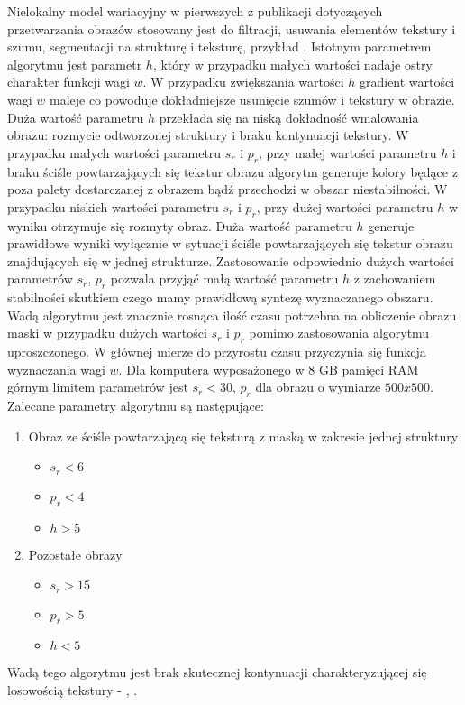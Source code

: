 \documentclass[12pt, twoside, openany]{report}
\theoremstyle{definition}
\begin{document}
Nielokalny model wariacyjny w pierwszych z publikacji dotyczących przetwarzania obrazów stosowany jest do filtracji, usuwania elementów tekstury i szumu, segmentacji na strukturę i teksturę, przykład \cite{buades2005non}. Istotnym parametrem algorytmu jest parametr $h$, który w przypadku małych wartości nadaje ostry charakter funkcji wagi $w$. W przypadku zwiększania wartości $h$ gradient wartości wagi $w$ maleje co powoduje dokładniejsze usunięcie szumów i tekstury w obrazie. Duża wartość parametru $h$ przekłada się na niską dokładność wmalowania obrazu: rozmycie odtworzonej struktury i braku kontynuacji tekstury. W przypadku małych wartości parametru $s_r$ i $p_r$, przy małej wartości parametru $h$ i braku ściśle powtarzających się tekstur obrazu algorytm generuje kolory będące z poza palety dostarczanej z obrazem bądź przechodzi w obszar niestabilności. W przypadku niskich wartości parametru  $s_r$ i $p_r$, przy dużej wartości parametru $h$ w wyniku otrzymuje się rozmyty obraz. Duża wartość parametru $h$ generuje prawidłowe wyniki wyłącznie w sytuacji ściśle powtarzających się tekstur obrazu znajdujących się w jednej strukturze. Zastosowanie odpowiednio dużych wartości parametrów $s_r$, $p_r$ pozwala przyjąć małą wartość parametru $h$ z zachowaniem stabilności skutkiem czego mamy prawidłową syntezę wyznaczanego obszaru. Wadą algorytmu jest znacznie rosnąca ilość czasu potrzebna na obliczenie obrazu maski w przypadku dużych wartości $s_r$ i $p_r$ pomimo zastosowania algorytmu uproszczonego. W głównej mierze do przyrostu czasu przyczynia się funkcja wyznaczania wagi $w$. Dla komputera wyposażonego w 8 GB pamięci RAM górnym limitem parametrów jest $s_r <30$, $p_r$ dla obrazu o wymiarze $500x500$. Zalecane parametry algorytmu są następujące:
\begin{enumerate}
\item Obraz ze ściśle powtarzającą się teksturą z maską w zakresie jednej struktury
\begin{itemize}
\item $s_r < 6$
\item $p_r < 4$
\item $h > 5$
\end{itemize}
\item Pozostałe obrazy
\begin{itemize}
\item $s_r > 15$
\item $p_r > 5$
\item $h < 5$
\end{itemize}
\end{enumerate}
Wadą tego algorytmu jest brak skutecznej kontynuacji charakteryzującej się losowością tekstury - \kotmyszm, \ObrIm .
\end{document}
